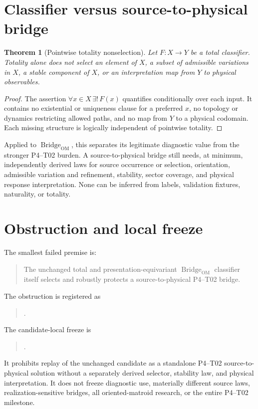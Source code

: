 \documentclass[11pt]{article}
\newtheorem{theorem}{Theorem}
\newcommand{\Bridge}{\operatorname{Bridge}_{\mathrm{OM}}}
\begin{document}
\section{Classifier versus source-to-physical bridge}

\begin{theorem}[Pointwise totality nonselection]
Let $F:X\to Y$ be a total classifier.  Totality alone does not select an
element of $X$, a subset of admissible variations in $X$, a stable component
of $X$, or an interpretation map from $Y$ to physical observables.
\end{theorem}

\begin{proof}
The assertion $\forall x\in X\,\exists!\,F(x)$ quantifies conditionally over
each input.  It contains no existential or uniqueness clause for a preferred
$x$, no topology or dynamics restricting allowed paths, and no map from $Y$
to a physical codomain.  Each missing structure is logically independent of
pointwise totality.
\end{proof}

Applied to $\Bridge$, this separates its legitimate diagnostic value from the
stronger P4--T02 burden.  A source-to-physical bridge still needs, at minimum,
independently derived laws for source occurrence or selection, orientation,
admissible variation and refinement, stability, sector coverage, and physical
response interpretation.  None can be inferred from labels, validation
fixtures, naturality, or totality.

\section{Obstruction and local freeze}

The smallest failed premise is:
\begin{quote}
The unchanged total and presentation-equivariant $\Bridge$ classifier itself
selects and robustly protects a source-to-physical P4--T02 bridge.
\end{quote}
The obstruction is registered as
\begin{quote}
\small{}.
\end{quote}
The candidate-local freeze is
\begin{quote}
\small{}.
\end{quote}
It prohibits replay of the unchanged candidate as a standalone P4--T02
source-to-physical solution without a separately derived selector, stability
law, and physical interpretation.  It does not freeze diagnostic use,
materially different source laws, realization-sensitive bridges, all
oriented-matroid research, or the entire P4--T02 milestone.
\end{document}
